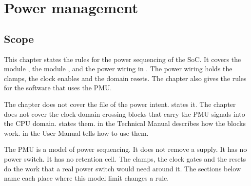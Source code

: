 \chapter{Power management}\label{ds:ch:mod-power-management}

\section{Scope}\label{ds:ch:mod-power-management:scope}
This chapter states the rules for the power sequencing of the SoC. It covers the module , the module , and the power wiring in . The power wiring holds the clamps, the clock enables and the domain resets. The chapter also gives the rules for the software that uses the PMU.

The chapter does not cover the file of the power intent.  states it. The chapter does not cover the clock-domain crossing blocks that carry the PMU signals into the CPU domain.  states them.  in the Technical Manual describes how the blocks work.  in the User Manual tells how to use them.

\begin{information}
The PMU is a model of power sequencing. It does not remove a supply. It has no power switch. It has no retention cell. The clamps, the clock gates and the resets do the work that a real power switch would need around it. The sections below name each place where this model limit changes a rule.
\end{information}


